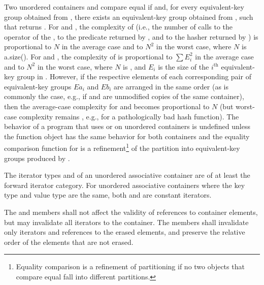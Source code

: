 \pnum
Two unordered containers  and  compare equal if
 and, for every equivalent-key group
 obtained from , there exists an
equivalent-key group  obtained from ,
such that
 returns . For
 and , the complexity of
 (i.e., the number of calls to the \tcode{==} operator
of the , to the predicate returned by ,
and to the hasher returned by ) is proportional to
$N$ in the average case and to $N^2$ in the worst case, where $N$ is
a.size(). For  and ,
the complexity of  is proportional to $\sum E_i^2$
in the average case and to $N^2$ in the worst case, where $N$ is ,
and $E_i$ is the size of the $i^\text{th}$ equivalent-key group in .
However, if the respective elements of each corresponding pair of
equivalent-key groups $Ea_i$ and $Eb_i$ are arranged in the same order
(as is commonly the case, e.g., if  and  are unmodified copies
of the same container), then the average-case complexity for
 and  becomes
proportional to $N$ (but worst-case complexity remains , e.g., for
a pathologically bad hash function). The behavior of a program that uses
 or  on unordered containers is undefined
unless the  function object has
the same behavior for both containers and the equality comparison function
for  is a refinement\footnote{Equality comparison is a refinement
of partitioning if no two objects that
compare equal fall into different partitions.}
of the partition into equivalent-key groups produced by .

\pnum
{}%
The iterator types  and  of
an unordered associative container are of at least the forward iterator
category.  For unordered associative containers where the key type and
value type are the same, both  and
 are constant iterators.

\pnum
{}%
The  and  members shall not affect the validity of references to
container elements, but may invalidate all iterators to the
container.  The  members shall invalidate only iterators and
references to the erased elements, and preserve the relative order of the
elements that are not erased.

